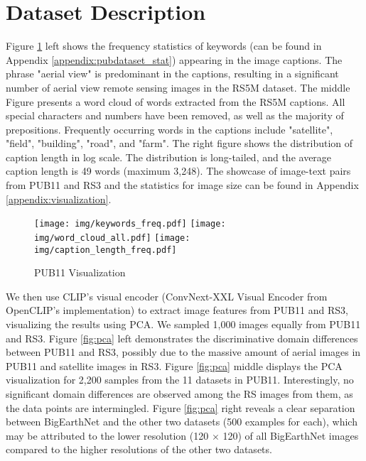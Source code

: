 \documentclass[journal]{IEEEtran}
\begin{document}
\section{Dataset Description}

Figure \ref{fig:dataset_description} left shows the frequency statistics of keywords (can be found in Appendix \ref{appendix:pubdataset_stat}) appearing in the image captions. The phrase "aerial view" is predominant in the captions, resulting in a significant number of aerial view remote sensing images in the RS5M dataset. The middle Figure presents a word cloud of words extracted from the RS5M captions. All special characters and numbers have been removed, as well as the majority of prepositions. Frequently occurring words in the captions include "satellite", "field", "building", "road", and "farm". The right figure shows the distribution of caption length in log scale. The distribution is long-tailed, and the average caption length is 49 words (maximum 3,248). The showcase of image-text pairs from PUB11 and RS3 and the statistics for image size can be found in Appendix \ref{appendix:visualization}.

\begin{figure}[htbp]
    \centering
    \texttt{[image: img/keywords\_freq.pdf]}
    \texttt{[image: img/word\_cloud\_all.pdf]}
    \texttt{[image: img/caption\_length\_freq.pdf]}
    \caption{PUB11 Visualization}
    \label{fig:dataset_description}
\end{figure}

 We then use CLIP's visual encoder (ConvNext-XXL Visual Encoder from OpenCLIP's implementation) to extract image features from PUB11 and RS3, visualizing the results using PCA. We sampled 1,000 images equally from PUB11 and RS3. Figure \ref{fig:pca} left demonstrates the discriminative domain differences between PUB11 and RS3, possibly due to the massive amount of aerial images in PUB11 and satellite images in RS3. Figure \ref{fig:pca} middle displays the PCA visualization for 2,200 samples from the 11 datasets in PUB11. Interestingly, no significant domain differences are observed among the RS images from them, as the data points are intermingled. Figure \ref{fig:pca} right reveals a clear separation between BigEarthNet and the other two datasets (500 examples for each), which may be attributed to the lower resolution (120 $\times$ 120) of all BigEarthNet images compared to the higher resolutions of the other two datasets.
 
\end{document}
